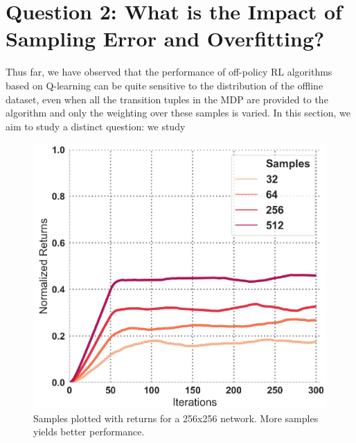 \section{Question 2: What is the Impact of Sampling Error and Overfitting?}
\label{sec:overfitting}



Thus far, we have observed that the performance of off-policy RL algorithms based on Q-learning can be quite sensitive to the distribution of the offline dataset, even when all the transition tuples in the MDP are provided to the algorithm and only the weighting over these samples is varied. In this section, we aim to study a distinct question: we study
\begin{figure}
    \centering
    \vspace{-10pt}
    \includegraphics[scale=0.4]{chapters/diagnosing_q/images/samples_arch.pdf}
    \vspace{-0.2cm}
    \caption{\label{fig:sampling_256} Samples plotted with returns for a 256x256 network. More samples yields better performance.}
    \vspace{-0.5cm}
\end{figure}
